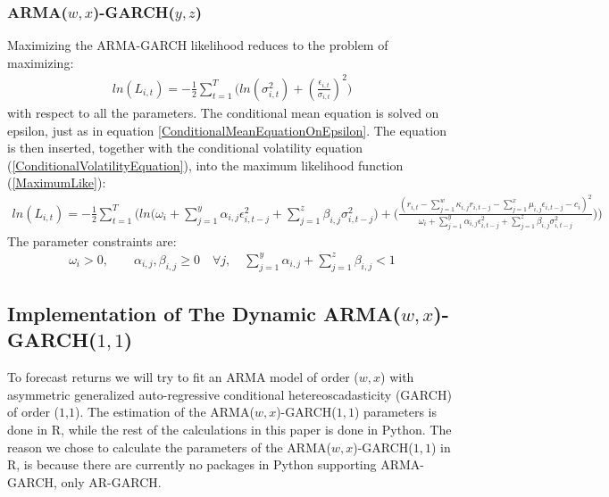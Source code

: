 \subsubsection{ARMA($w,x$)-GARCH($y,z$)}
Maximizing the ARMA-GARCH likelihood reduces to the problem of maximizing:
\begin{align} 
    ln(L_{i,t})=-\frac{1}{2}\sum_{t=1}^T\bigg( ln(\sigma_{i,t}^2)+(\frac{\epsilon_{i,t}}{\sigma_{i,t}})^2\bigg)   \label{MaximumLike}
\end{align}
with respect to all the parameters. The conditional mean equation is solved on epsilon, just as in equation \ref{ConditionalMeanEquationOnEpsilon}. The equation is then inserted, together with the conditional volatility equation (\ref{ConditionalVolatilityEquation}), into the maximum likelihood function (\ref{MaximumLike}):
\begin{align} 
    ln(L_{i,t})=-\frac{1}{2}\sum_{t=1}^T \Bigg(ln\Big(\omega_i + \sum_{j=1}^y\alpha_{i,j}\epsilon_{i,t-j}^2+\sum_{j=1}^z\beta_{i,j}\sigma_{i,t-j}^2\big)+\Big(\frac{(r_{i,t}-\sum_{j=1}^w\kappa_{i,j} r_{i,t-j}-\sum_{j=1}^x\mu_{i,j} \epsilon_{i,t-j}-c_i)^2}{\omega_i + \sum_{j=1}^y \alpha_{i,j} \epsilon_{i,t-j}^2 +\sum_{j=1}^z\beta_{i,j}\sigma_{i,t-j}^2}\Big)\Bigg)   \label{fullMaximumLike}
\end{align}
The parameter constraints are:
\begin{align} 
    \omega_i>0,\quad\quad \alpha_{i,j},\beta_{i,j}\geq0 \quad \forall j, \quad \sum_{j=1}^y\alpha_{i,j}+\sum_{j=1}^z\beta_{i,j}<1 \label{ParameterConstraints}
\end{align}

\subsection{Implementation of The Dynamic ARMA($w,x$)-GARCH($1,1$)}
To forecast returns we will try to fit an ARMA model of order ($w,x$) with asymmetric generalized auto-regressive conditional hetereoscadasticity (GARCH) of order ($1$,$1$). The estimation of the ARMA($w,x$)-GARCH($1,1$) parameters is done in R, while the rest of the calculations in this paper is done in Python. The reason we chose to calculate the parameters of the ARMA($w,x$)-GARCH($1,1$) in R, is because there are currently no packages in Python supporting ARMA-GARCH, only AR-GARCH. 

